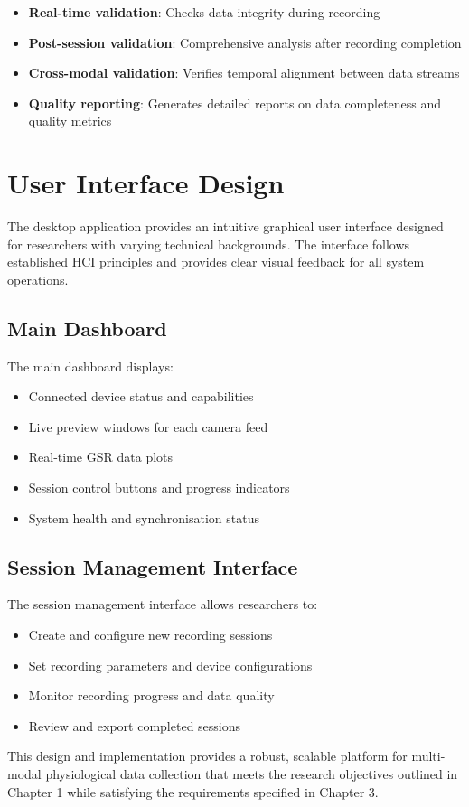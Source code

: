 \begin{itemize}
\item \textbf{Real-time validation}: Checks data integrity during recording
\item \textbf{Post-session validation}: Comprehensive analysis after recording completion
\item \textbf{Cross-modal validation}: Verifies temporal alignment between data streams
\item \textbf{Quality reporting}: Generates detailed reports on data completeness and quality metrics
\end{itemize}

\section{User Interface Design}

The desktop application provides an intuitive graphical user interface designed for researchers with varying technical backgrounds. The interface follows established HCI principles and provides clear visual feedback for all system operations.

\subsection{Main Dashboard}

The main dashboard displays:

\begin{itemize}
\item Connected device status and capabilities
\item Live preview windows for each camera feed
\item Real-time GSR data plots
\item Session control buttons and progress indicators
\item System health and synchronisation status
\end{itemize}

\subsection{Session Management Interface}

The session management interface allows researchers to:

\begin{itemize}
\item Create and configure new recording sessions
\item Set recording parameters and device configurations
\item Monitor recording progress and data quality
\item Review and export completed sessions
\end{itemize}

This design and implementation provides a robust, scalable platform for multi-modal physiological data collection that meets the research objectives outlined in Chapter 1 while satisfying the requirements specified in Chapter 3.
